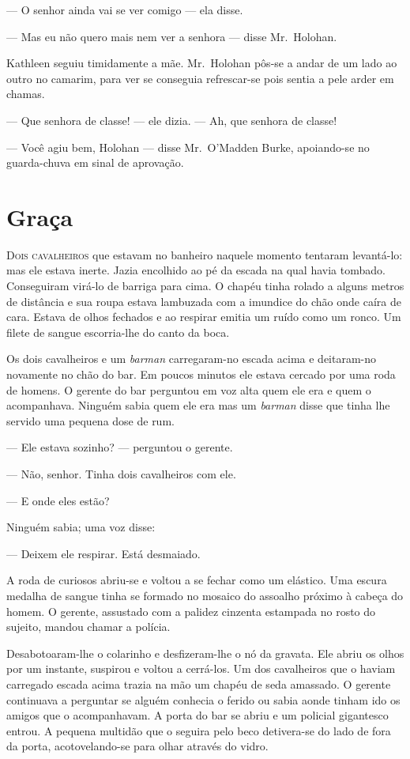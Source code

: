 --- O senhor ainda vai se ver comigo --- ela disse.

--- Mas eu não quero mais nem ver a senhora --- disse Mr.~Holohan.

Kathleen seguiu timidamente a mãe.  Mr.~Holohan pôs-se a andar de um lado ao
outro no camarim, para ver se conseguia refrescar-se pois sentia a pele arder
em chamas.

--- Que senhora de classe! --- ele dizia.  --- Ah, que senhora de classe!

--- Você agiu bem, Holohan --- disse Mr.~O’Madden Burke, apoiando-se no
guarda-chuva em sinal de aprovação.


\chapter{Graça}

\textsc{Dois cavalheiros} que estavam no banheiro naquele momento tentaram
levantá-lo: mas ele estava inerte.  Jazia encolhido ao pé da escada na qual
havia tombado.  Conseguiram virá-lo de barriga para cima.  O chapéu tinha
rolado a alguns metros de distância e sua roupa estava lambuzada com a imundice
do chão onde caíra de cara.  Estava de olhos fechados e ao respirar emitia um
ruído como um ronco.  Um filete de sangue escorria-lhe do canto da boca.

Os dois cavalheiros e um \textit{barman} carregaram-no escada acima e
deitaram-no novamente no chão do bar.  Em poucos minutos ele estava cercado por
uma roda de homens.  O gerente do bar perguntou em voz alta quem ele era e quem
o acompanhava.  Ninguém sabia quem ele era mas um \textit{barman} disse que
tinha lhe servido uma pequena dose de rum.

--- Ele estava sozinho? --- perguntou o gerente.

--- Não, senhor.  Tinha dois cavalheiros com ele.

--- E onde eles estão?

Ninguém sabia; uma voz disse:

--- Deixem ele respirar.  Está desmaiado.

A roda de curiosos abriu-se e voltou a se fechar como um elástico.  Uma escura
medalha de sangue tinha se formado no mosaico do assoalho próximo à cabeça do
homem.  O gerente, assustado com a palidez cinzenta estampada no rosto do
sujeito, mandou chamar a polícia.

Desabotoaram-lhe o colarinho e desfizeram-lhe o nó da gravata.  Ele abriu os
olhos por um instante, suspirou e voltou a cerrá-los.  Um dos cavalheiros que o
haviam carregado escada acima trazia na mão um chapéu de seda amassado.  O
gerente continuava a perguntar se alguém conhecia o ferido ou sabia aonde
tinham ido os amigos que o acompanhavam.  A porta do bar se abriu e um policial
gigantesco entrou.  A pequena multidão que o seguira pelo beco detivera-se do
lado de fora da porta, acotovelando-se para olhar através do vidro.

